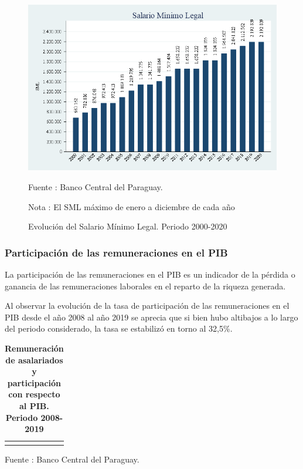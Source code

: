 \begin{figure}[H]
\begin{center}
                    \caption{Evolución del Salario Mínimo Legal. Periodo 2000-2020}
                    \includegraphics[scale=0.55]{BCP_sml.png}
                                    \item \footnotesize Fuente : Banco Central del Paraguay. 
                                    \item \footnotesize Nota : El SML máximo de enero a diciembre de cada año
                    \end{center}
\end{figure}

\subsubsection{Participación de las remuneraciones en el PIB}

La participación de las remuneraciones en el PIB es un indicador de la
pérdida o ganancia de las remuneraciones laborales en el reparto de la
riqueza generada.

Al observar la evolución de la tasa de participación de las
remuneraciones en el PIB desde el año 2008 al año 2019 se aprecia que si
bien hubo altibajos a lo largo del periodo considerado, la tasa se
estabilizó en torno al 32,5\%.

\begin{table}[H]
\begin{center}
\caption{\bf{Remuneración de asalariados y participación con respecto al PIB. Periodo 2008-2019}}
\begin{tabular}{l|rrrrrr}
\scriptsize

\end{tabular}
                    \item \footnotesize Fuente : Banco Central del Paraguay. 
\end{center}
\end{table}

